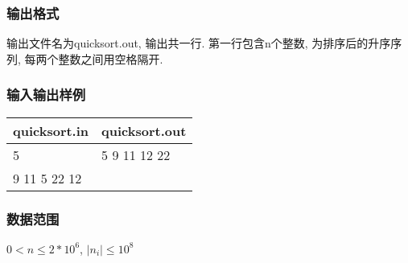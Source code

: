 \subsubsection{输出格式}
输出文件名为quicksort.out, 输出共一行.
第一行包含n个整数, 为排序后的升序序列, 每两个整数之间用空格隔开.
\subsubsection{输入输出样例}
\begin{table}[h!]
	\centering
	\begin{tabular}{|l|l|}
		\hline
		quicksort.in & quicksort.out \\
		\hline
		5            & 5 9 11 12 22  \\
		9 11 5 22 12 & ~             \\
		\hline
	\end{tabular}
\end{table}
\subsubsection{数据范围}
$ 0 < n \leq 2*10^6 $,
$ | n_i | \leq 10^8 $
